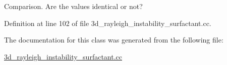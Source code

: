 Comparison. Are the values identical or not? 



Definition at line 102 of file 3d\+\_\+rayleigh\+\_\+instability\+\_\+surfactant.\+cc.



The documentation for this class was generated from the following file\+:\begin{DoxyCompactItemize}
\item 
\hyperlink{3d__rayleigh__instability__surfactant_8cc}{3d\+\_\+rayleigh\+\_\+instability\+\_\+surfactant.\+cc}\end{DoxyCompactItemize}
